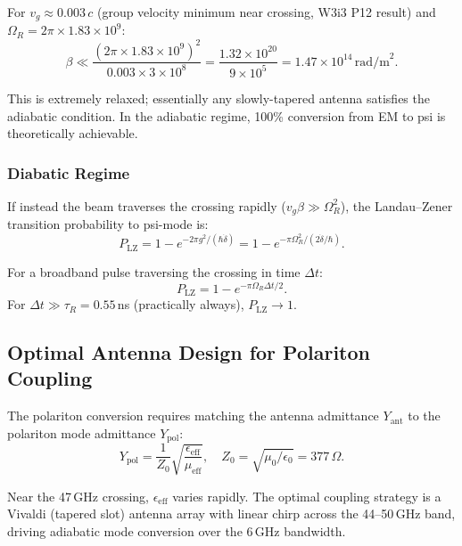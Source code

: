 \documentclass[aps,prd,twocolumn,superscriptaddress]{revtex4-2}
\begin{document}
For $v_g \approx 0.003\,c$ (group velocity minimum near crossing,
W3i3 P12 result) and $\Omega_R = 2\pi\times1.83\times10^9$:
\begin{equation}
\beta \ll \frac{(2\pi\times1.83\times10^9)^2}{0.003\times3\times10^8}
= \frac{1.32\times10^{20}}{9\times10^5}
= 1.47\times10^{14}\,\mathrm{rad/m}^2.
\label{eq:adiabatic_beta}
\end{equation}

This is extremely relaxed; essentially any slowly-tapered antenna
satisfies the adiabatic condition.  In the adiabatic regime,
100\% conversion from EM to psi is theoretically achievable.

\subsubsection{Diabatic Regime}

If instead the beam traverses the crossing rapidly
($v_g\beta \gg \Omega_R^2$), the Landau--Zener transition
probability to psi-mode is:
\begin{equation}
P_\mathrm{LZ} = 1 - e^{-2\pi g^2 / (\hbar \dot{\delta})}
= 1 - e^{-\pi\Omega_R^2/(2\dot{\delta}/\hbar)}.
\label{eq:landau_zener}
\end{equation}

For a broadband pulse traversing the crossing in time $\Delta t$:
\begin{equation}
P_\mathrm{LZ} = 1 - e^{-\pi\Omega_R\Delta t/2}.
\label{eq:LZ_practical}
\end{equation}
For $\Delta t \gg \tau_R = 0.55$\,ns (practically always), $P_\mathrm{LZ} \to 1$.

\subsection{Optimal Antenna Design for Polariton Coupling}

The polariton conversion requires matching the antenna admittance
$Y_\mathrm{ant}$ to the polariton mode admittance $Y_\mathrm{pol}$:
\begin{equation}
Y_\mathrm{pol} = \frac{1}{Z_0}\sqrt{\frac{\epsilon_\mathrm{eff}}{\mu_\mathrm{eff}}},
\quad
Z_0 = \sqrt{\mu_0/\epsilon_0} = 377\,\Omega.
\label{eq:Ypol}
\end{equation}

Near the 47\,GHz crossing, $\epsilon_\mathrm{eff}$ varies rapidly.
The optimal coupling strategy is a Vivaldi (tapered slot) antenna
array with linear chirp across the 44--50\,GHz band, driving
adiabatic mode conversion over the 6\,GHz bandwidth.
\end{document}
